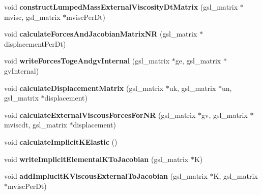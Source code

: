 \begin{DoxyCompactItemize}
\item 
\hypertarget{classSimulation_a5043ad79a43b96e1840453c0d643826a}{}void {\bfseries construct\+Lumped\+Mass\+External\+Viscosity\+Dt\+Matrix} (gsl\+\_\+matrix $\ast$mvisc, gsl\+\_\+matrix $\ast$mvisc\+Per\+Dt)\label{classSimulation_a5043ad79a43b96e1840453c0d643826a}

\item 
\hypertarget{classSimulation_a1505c29d5aa3fa9f9cce002b4e46cc59}{}void {\bfseries calculate\+Forces\+And\+Jacobian\+Matrix\+N\+R} (gsl\+\_\+matrix $\ast$displacement\+Per\+Dt)\label{classSimulation_a1505c29d5aa3fa9f9cce002b4e46cc59}

\item 
\hypertarget{classSimulation_a405edad21e0577209e4dd605fcebf56e}{}void {\bfseries write\+Forces\+Toge\+Andgv\+Internal} (gsl\+\_\+matrix $\ast$ge, gsl\+\_\+matrix $\ast$gv\+Internal)\label{classSimulation_a405edad21e0577209e4dd605fcebf56e}

\item 
\hypertarget{classSimulation_aca8ebab2338272ad16cb456406e5745d}{}void {\bfseries calculate\+Displacement\+Matrix} (gsl\+\_\+matrix $\ast$uk, gsl\+\_\+matrix $\ast$un, gsl\+\_\+matrix $\ast$displacement)\label{classSimulation_aca8ebab2338272ad16cb456406e5745d}

\item 
\hypertarget{classSimulation_ae9f5e5929100a9697bb9230c6ee0c825}{}void {\bfseries calculate\+External\+Viscous\+Forces\+For\+N\+R} (gsl\+\_\+matrix $\ast$gv, gsl\+\_\+matrix $\ast$mviscdt, gsl\+\_\+matrix $\ast$displacement)\label{classSimulation_ae9f5e5929100a9697bb9230c6ee0c825}

\item 
\hypertarget{classSimulation_ae874efdb99d95556447461c5196b4836}{}void {\bfseries calculate\+Implicit\+K\+Elastic} ()\label{classSimulation_ae874efdb99d95556447461c5196b4836}

\item 
\hypertarget{classSimulation_ae32288af50e000ecc19333fe5d3b2113}{}void {\bfseries write\+Implicit\+Elemental\+K\+To\+Jacobian} (gsl\+\_\+matrix $\ast$K)\label{classSimulation_ae32288af50e000ecc19333fe5d3b2113}

\item 
\hypertarget{classSimulation_a09dfbcf2388405b337eda1e990623ba5}{}void {\bfseries add\+Implucit\+K\+Viscous\+External\+To\+Jacobian} (gsl\+\_\+matrix $\ast$K, gsl\+\_\+matrix $\ast$mvisc\+Per\+Dt)\label{classSimulation_a09dfbcf2388405b337eda1e990623ba5}


\end{DoxyCompactItemize}
